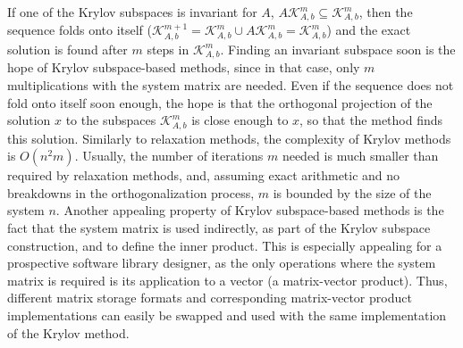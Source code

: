 If one of the Krylov subspaces is invariant for $A$, \ie $A \mathcal{K}_{A,
b}^m \subseteq \mathcal{K}_{A, b}^m$, then the sequence folds onto itself
($\mathcal{K}_{A, b}^{m + 1} = \mathcal{K}_{A, b}^m \cup A \mathcal{K}_{A, b}^m
= \mathcal{K}_{A, b}^m$) and the exact solution is found after $m$ steps in
$\mathcal{K}_{A, b}^m$. Finding an invariant subspace soon is the hope of Krylov
subspace-based methods, since in that case, only $m$ multiplications with the
system matrix are needed. Even if the sequence does not fold onto itself soon
enough, the hope is that the orthogonal projection of the solution $x$ to the
subspaces $\mathcal{K}_{A, b}^m$ is close enough to $x$, so that the method
finds this solution. Similarly to relaxation methods, the complexity of Krylov
methods is $O(n^2 m)$. Usually, the number of iterations $m$ needed is much
smaller than required by relaxation methods, and, assuming exact arithmetic and
no breakdowns in the orthogonalization process, $m$ is bounded by the size of
the system $n$.  Another appealing property of Krylov subspace-based methods is
the fact that the system matrix is used indirectly, as part of the Krylov
subspace construction, and to define the inner product. This is especially
appealing for a prospective software library designer, as the only operations
where the system matrix is required is its application to a vector (\ie a
matrix-vector product).  Thus, different matrix storage formats and
corresponding matrix-vector product implementations can easily be swapped and
used with the same implementation of the Krylov method.

